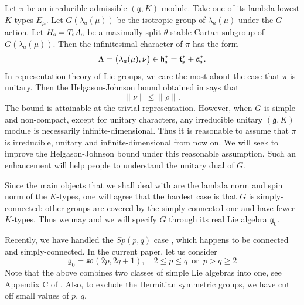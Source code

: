 \documentclass[11pt]{amsart}
\theoremstyle{plain}
\theoremstyle{definition}
\newcommand{\fra}{\mathfrak{a}}
\newcommand{\frg}{\mathfrak{g}}
\newcommand{\frh}{\mathfrak{h}}
\newcommand{\frt}{\mathfrak{t}}
\begin{document}
Let $\pi$ be an irreducible admissible $(\frg, K)$ module. Take one of its lambda lowest $K$-types $E_{\mu}$. Let $G(\lambda_a(\mu))$ be the isotropic group of $\lambda_a(\mu)$ under the $G$ action. Let $H_{\rm s}=T_{\rm s} A_{\rm s}$ be a maximally split $\theta$-stable Cartan subgroup of $G(\lambda_a(\mu))$.
Then the infinitesimal character of  $\pi$ has the form
\begin{equation}\label{inf-char}
	\Lambda=\big(\lambda_a(\mu),\nu\big)\in \frh_{\rm s}^*=\frt_{\rm s}^*+\fra_{\rm s}^*.
\end{equation}
In representation theory of Lie groups, we care the most about the case that $\pi$ is unitary. Then the Helgason-Johnson bound obtained in \cite{HJ} says that
$$
\|\nu\|\leq \|\rho\|.
$$
The bound is attainable at the trivial representation. However, when $G$ is simple and non-compact, except for unitary characters, any irreducible unitary $(\frg, K)$ module is necessarily infinite-dimensional. Thus it is reasonable to assume that $\pi$ is irreducible, unitary and infinite-dimensional from now on. We will seek to improve the Helgason-Johnson bound under this reasonable assumption. Such an enhancement will help people to understand the unitary dual of $G$.

Since the main objects that we shall deal with are the lambda norm and spin norm of the $K$-types, one will agree that the hardest case is that $G$ is simply-connected: other groups are covered by the simply connected one and have fewer $K$-types. Thus we may and we will specify $G$ through its real Lie algebra $\frg_0$.

Recently, we have handled the $Sp(p, q)$ case \cite{DY2}, which happens to be connected and simply-connected. In the current paper, let us consider
\begin{equation}\label{g0}
\frg_0= \mathfrak{so}(2p, 2q+1), \quad 2\le p\leq q \, \mbox{  or  }\, p>q\ge 2
\end{equation}
Note that the above combines two classes of simple Lie algebras into one, see Appendix C of \cite{Kn}.
Also, to exclude the Hermitian symmetric groups,  we have cut off small values of $p$, $q$.
\end{document}
